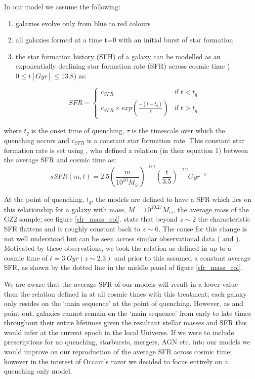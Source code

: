 \documentclass{mn2e}
\begin{document}
In our model we assume the following:
\begin{enumerate}
\item galaxies evolve only from blue to red colours
\item all galaxies formed at a time t=0 with an initial burst of star formation 
\item the star formation history (SFH) of a galaxy can be modelled as an exponentially declining star formation rate (SFR) across cosmic time ($0 \leq t [Gyr] \leq 13.8$) as:

\[
SFR = 
\begin{cases}
c_{SFR} & \text{if } t < t_{q} \\
c_{SFR} \times exp{\left( \frac{-(t-t_{q})}{\tau}\right)} & \text{if } t > t_{q}
\end{cases}
\]
\end{enumerate}
where $t_{q}$ is the onset time of quenching, $\tau$ is the timescale over which the quenching occurs and $c_{SFR}$ is a constant star formation rate. This constant star formation rate is set using \citet{Peng}, who defined a relation (in their equation 1) between the average SFR and cosmic time as:
\begin{equation*}
sSFR(m,t) = 2.5 \left( \frac{m}{10^{10} M_{\odot}} \right)^{-0.1} \left(\frac{t}{3.5}\right)^{-2.2} Gyr^{-1}
\end{equation*}



At the point of quenching, $t_{q}$, the models are defined to have a SFR which lies on this relationship for a galaxy with mass, $M = 10^{10.27} M_{\odot}$, the average mass of the GZ2 sample; see figure \ref{sfr_mass_col}. \citet{Peng} state that beyond $z \sim 2$ the characteristic SFR flattens and is roughly constant back to $z\sim6$. The cause for this change is not well understood but can be seen across similar observational data (\cite{Gonzalez} and \cite{Beth}). Motivated by these observations, we took the relation as defined in \citet{Peng} up to a cosmic time of $t=3~Gyr (z \sim 2.3)$ and prior to this assumed a constant average SFR, as shown by the dotted line in the middle panel of figure \ref{sfr_mass_col}.
 
We are aware that the average SFR of our models will result in a lower value than the relation defined in \citet{Peng} at all cosmic times with this treatment; each galaxy only resides on the `main sequence' at the point of quenching. However, as \citet{Beth} and \citet{Heinis14} point out, galaxies cannot remain on the `main sequence' from early to late times throughout their entire lifetimes given the resultant stellar masses and SFR this would infer at the current epoch in the local Universe. If we were to include prescriptions for no quenching, starbursts, mergers, AGN etc. into our models we would improve on our reproduction of the average SFR across cosmic time; however in the interest of Occam's razor \citep{Sivia, Sok02} we decided to focus entirely on a quenching only model. 
\end{document}
